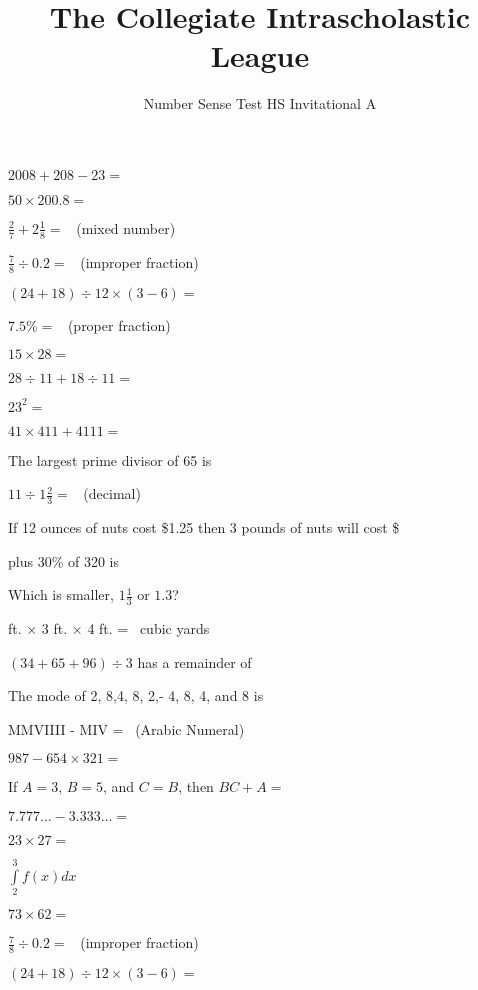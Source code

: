 \documentclass{numbersense}
\title{The Collegiate Intrascholastic League}
\subtitle{Number Sense Test \bigdot HS Invitational A \bigdot 2008}
\begin{document}
\begin{questions}

    \q[2265] $2008 + 208 - 23 = $ \ans

    \q $50 \times 200.8 = $ \ans

    \q $\frac{2}{7} + 2 \frac{1}{8} = $ \ans~(mixed number)

    \q[$\frac{35}{8}$] $\frac{7}{8} \div 0.2 = $ \ans~(improper fraction)

    \q $(24 + 18) \div 12 \times (3-6) =$ \ans

    \q $7.5\% = $ \ans~(proper fraction)

    \q $15 \times 28 = $ \ans

    \q $28 \div 11 + 18 \div 11 = $ \ans

    \q $23^2 =$ \ans

    \aq[testing] $41 \times 411 + 4111=$ \ans

    \q The largest prime divisor of 65 is \ans

    \q $11 \div 1\frac{2}{3}=$ \ans~(decimal)

    \q If 12 ounces of nuts cost \$1.25 then 3 pounds of nuts will cost \$\ans

     plus 30\% of 320 is \ans

    \q Which is smaller, $1\frac{1}{3}$ or $1.3$? \ans

     ft. $ \times $ 3 ft. $\times$ 4 ft. = \ans~cubic yards

    \q $(34 + 65 + 96) \div 3$ has a remainder of \ans

    \q The mode of 2, 8,4, 8, 2,- 4, 8, 4, and 8 is \ans

    \q MMVIIII - MIV = \ans~(Arabic Numeral)

    \q $987 - 654 \times 321 = $ \ans

    \q If $A = 3$, $B=5$, and $C = B$, then $BC + A = $ \ans

    \q $7.777\ldots - 3.333\ldots = $ \ans

    \q $ 23 \times 27 = $ \ans

    \q $\int\limits_{2}^{3} f(x) dx$

    \aq $73 \times 62 =$ \ans

    \q[$4\frac{3}{8}$] $\frac{7}{8} \div 0.2 = $ \ans~(improper fraction)

    \q[-10.5] $(24 + 18) \div 12 \times (3-6) =$ \ans

\end{questions}
\end{document}
